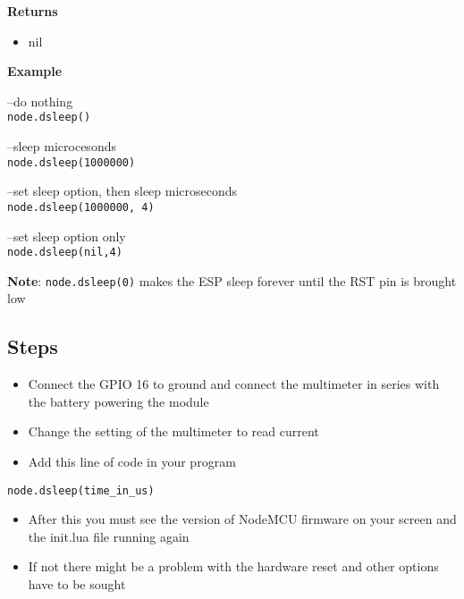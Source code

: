 \documentclass[16pt]{article}
\begin{document}
\textbf{Returns}

\begin{itemize}

\item
  nil
\end{itemize}

\textbf{Example}
\vspace{0.1cm}

--do nothing\\
\texttt{node.dsleep()}\\

\vspace{0.1cm}

--sleep microcesonds\\
\texttt{node.dsleep(1000000)}\\

\vspace{0.1cm}

--set sleep option, then sleep microseconds\\
\texttt{node.dsleep(1000000, 4)}\\

\vspace{0.1cm}

--set sleep option only\\
\texttt{node.dsleep(nil,4)}

\vspace{0.3cm}

\textbf{Note}: \texttt{node.dsleep(0)} makes the ESP sleep forever until
the RST pin is brought low


\vspace{0.5cm}
\subsection{Steps}

\begin{itemize}

\item
  Connect the GPIO 16 to ground and connect the multimeter in series
  with the battery powering the module
\item
  Change the setting of the multimeter to read current
\item
  Add this line of code in your program
\end{itemize}

\texttt{node.dsleep(time\_in\_us)}

\begin{itemize}

\item
  After this you must see the version of NodeMCU firmware on your screen
  and the init.lua file running again
\item
  If not there might be a problem with the hardware reset and other
  options have to be sought
\end{itemize}
\end{document}
